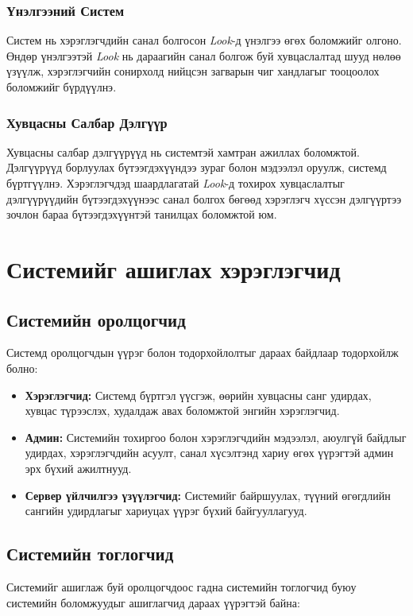\subsubsection{Үнэлгээний Систем}
Систем нь хэрэглэгчдийн санал болгосон \textit{Look}-д үнэлгээ өгөх боломжийг олгоно. Өндөр үнэлгээтэй \textit{Look} нь дараагийн санал болгож буй хувцаслалтад шууд нөлөө үзүүлж, хэрэглэгчийн сонирхолд нийцсэн загварын чиг хандлагыг тооцоолох боломжийг бүрдүүлнэ.

\subsubsection{Хувцасны Салбар Дэлгүүр}
Хувцасны салбар дэлгүүрүүд нь системтэй хамтран ажиллах боломжтой. Дэлгүүрүүд борлуулах бүтээгдэхүүндээ зураг болон мэдээлэл оруулж, системд бүртгүүлнэ. Хэрэглэгчдэд шаардлагатай \textit{Look}-д тохирох хувцаслалтыг дэлгүүрүүдийн бүтээгдэхүүнээс санал болгох бөгөөд хэрэглэгч хүссэн дэлгүүртээ зочлон бараа бүтээгдэхүүнтэй танилцах боломжтой юм.


\section{Системийг ашиглах хэрэглэгчид}

\subsection{Системийн оролцогчид}
Системд оролцогчдын үүрэг болон тодорхойлолтыг дараах байдлаар тодорхойлж болно:

\begin{itemize}
    \item \textbf{Хэрэглэгчид:} Системд бүртгэл үүсгэж, өөрийн хувцасны санг удирдах, хувцас түрээслэх, худалдаж авах боломжтой энгийн хэрэглэгчид.
    
    \item \textbf{Админ:} Системийн тохиргоо болон хэрэглэгчдийн мэдээлэл, аюулгүй байдлыг удирдах, хэрэглэгчдийн асуулт, санал хүсэлтэнд хариу өгөх үүрэгтэй админ эрх бүхий ажилтнууд.
    
    \item \textbf{Сервер үйлчилгээ үзүүлэгчид:} Системийг байршуулах, түүний өгөгдлийн сангийн удирдлагыг хариуцах үүрэг бүхий байгууллагууд.
\end{itemize}

\subsection{Системийн тоглогчид}
Системийг ашиглаж буй оролцогчдоос гадна системийн тоглогчид буюу системийн боломжуудыг ашиглагчид дараах үүрэгтэй байна:


